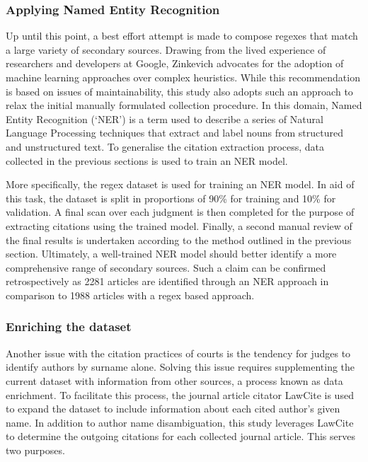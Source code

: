 \subsubsection{Applying Named Entity Recognition}

Up until this point, a best effort attempt is made to compose regexes that match a large variety of secondary sources. Drawing from the lived experience of researchers and developers at Google, Zinkevich advocates for the adoption of machine learning approaches over complex heuristics. While this recommendation is based on issues of maintainability, this study also adopts such an approach to relax the initial manually formulated collection procedure. In this domain, Named Entity Recognition (`NER') is a term used to describe a series of Natural Language Processing techniques that extract and label nouns from structured and unstructured text. To generalise the citation extraction process, data collected in the previous sections is used to train an NER model.

More specifically, the regex dataset is used for training an NER model. In aid of this task, the dataset is split in proportions of 90\% for training and 10\% for validation. A final scan over each judgment is then completed for the purpose of extracting citations using the trained model. Finally, a second manual review of the final results is undertaken according to the method outlined in the previous section. Ultimately, a well-trained NER model should better identify a more comprehensive range of secondary sources. Such a claim can be confirmed retrospectively as 2281 articles are identified through an NER approach in comparison to 1988 articles with a regex based approach.

\subsubsection{Enriching the dataset}

Another issue with the citation practices of courts is the tendency for judges to identify authors by surname alone. Solving this issue requires supplementing the current dataset with information from other sources, a process known as data enrichment. To facilitate this process, the journal article citator LawCite is used to expand the dataset to include information about each cited author's given name. In addition to author name disambiguation, this study leverages LawCite to determine the outgoing citations for each collected journal article. This serves two purposes.

